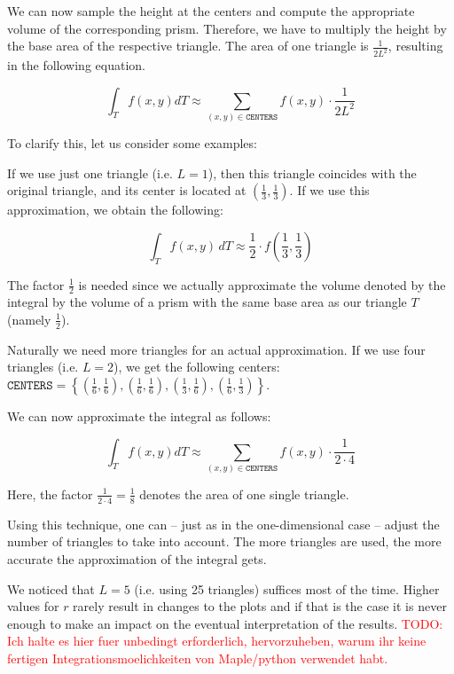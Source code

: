 \documentclass{article}
\newcommand{\todo}[2][]{\textcolor{red}{TODO\ifthenelse{\equal{#1}{}}{}{[#1]}: #2}}
\begin{document}
We can now sample the height at the centers and compute the appropriate volume of the corresponding prism. Therefore, we have to multiply the height by the base area of the respective triangle. The area of one triangle is $\frac{1}{2 L^2}$, resulting in the following equation.

\begin{equation}
  \int_T f(x,y) dT \approx \sum_{(x,y)\in\mathtt{CENTERS}} f(x,y) \cdot \frac{1}{2L^2}
\end{equation}

To clarify this, let us consider some examples:

If we use just one triangle (i.e. $L=1$), then this triangle coincides with the original triangle, and its center is located at $(\frac{1}{3}, \frac{1}{3})$. If we use this approximation, we obtain the following:

\begin{equation*}
  \int_T f(x,y)\, dT \approx \frac{1}{2} \cdot f(\frac{1}{3},\frac{1}{3})
\end{equation*}

The factor $\frac{1}{2}$ is needed since we actually approximate the volume denoted by the integral by the volume of a prism with the same base area as our triangle $T$ (namely $\frac{1}{2}$).

Naturally we need more triangles for an actual approximation. If we use four triangles (i.e. $L=2$), we get the following centers: $\mathtt{CENTERS} = \left\{ (\frac{1}{6}, \frac{1}{6}), (\frac{1}{6}, \frac{1}{6}), (\frac{1}{3}, \frac{1}{6}), (\frac{1}{6},\frac{1}{3}) \right\}$.

We can now approximate the integral as follows:

\begin{equation*}
  \int_T f(x,y) dT \approx \sum_{(x,y)\in\mathtt{CENTERS}} f(x,y)\cdot \frac{1}{2\cdot 4}
\end{equation*}

Here, the factor $\frac{1}{2\cdot 4}= \frac{1}{8}$ denotes the area of one single triangle.

Using this technique, one can -- just as in the one-dimensional case -- adjust the number of triangles to take into account. The more triangles are used, the more accurate the approximation of the integral gets.

We noticed that $L=5$ (i.e. using 25 triangles) suffices most of the time. Higher values for $r$ rarely result in changes to the plots and if that is the case it is never enough to make an impact on the eventual interpretation of the results.
\todo{Ich halte es hier fuer unbedingt erforderlich, hervorzuheben, warum ihr keine fertigen Integrationsmoelichkeiten von Maple/python verwendet habt.}
\end{document}
